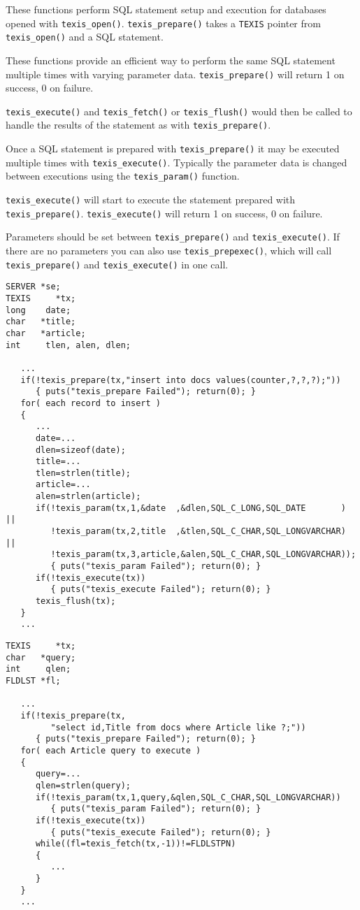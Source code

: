 \DESCRIPTION

These functions perform SQL statement setup and execution for databases
opened with \verb`texis_open()`. \verb`texis_prepare()` takes a \verb`TEXIS`
pointer from \verb`texis_open()` and a SQL statement.

These functions provide an efficient way to perform the same
SQL statement multiple times with varying parameter data.
\verb`texis_prepare()` will return 1 on success, 0 on failure.

\verb`texis_execute()` and \verb`texis_fetch()` or \verb`texis_flush()` would
then be called to handle the results of the statement as with \verb`texis_prepare()`.

Once a SQL statement is prepared with \verb`texis_prepare()` it may be
executed multiple times with \verb`texis_execute()`. Typically the parameter
data is changed between executions using the \verb`texis_param()` function.

\verb`texis_execute()` will start to execute the statement prepared with
\verb`texis_prepare()`.  \verb`texis_execute()` will return 1
on success, 0 on failure.

Parameters should be set between \verb`texis_prepare()` and
\verb`texis_execute()`.  If there are no parameters you can also use
\verb`texis_prepexec()`, which will call \verb`texis_prepare()` and
\verb`texis_execute()` in one call.

\EXAMPLE
\begin{verbatim}
SERVER *se;
TEXIS     *tx;
long    date;
char   *title;
char   *article;
int     tlen, alen, dlen;

   ...
   if(!texis_prepare(tx,"insert into docs values(counter,?,?,?);"))
      { puts("texis_prepare Failed"); return(0); }
   for( each record to insert )
   {
      ...
      date=...
      dlen=sizeof(date);
      title=...
      tlen=strlen(title);
      article=...
      alen=strlen(article);
      if(!texis_param(tx,1,&date  ,&dlen,SQL_C_LONG,SQL_DATE       ) ||
         !texis_param(tx,2,title  ,&tlen,SQL_C_CHAR,SQL_LONGVARCHAR) ||
         !texis_param(tx,3,article,&alen,SQL_C_CHAR,SQL_LONGVARCHAR));
         { puts("texis_param Failed"); return(0); }
      if(!texis_execute(tx))
         { puts("texis_execute Failed"); return(0); }
      texis_flush(tx);
   }
   ...
\end{verbatim}

\EXAMPLE
\begin{verbatim}
TEXIS     *tx;
char   *query;
int     qlen;
FLDLST *fl;

   ...
   if(!texis_prepare(tx,
         "select id,Title from docs where Article like ?;"))
      { puts("texis_prepare Failed"); return(0); }
   for( each Article query to execute )
   {
      query=...
      qlen=strlen(query);
      if(!texis_param(tx,1,query,&qlen,SQL_C_CHAR,SQL_LONGVARCHAR))
         { puts("texis_param Failed"); return(0); }
      if(!texis_execute(tx))
         { puts("texis_execute Failed"); return(0); }
      while((fl=texis_fetch(tx,-1))!=FLDLSTPN)
      {
         ...
      }
   }
   ...
\end{verbatim}

